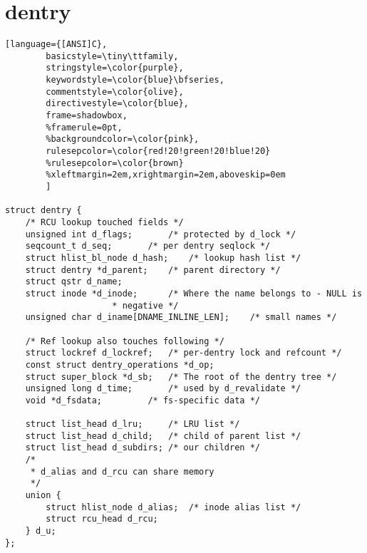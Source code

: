 \section{dentry}

\begin{lstlisting}[language={[ANSI]C},
        basicstyle=\tiny\ttfamily,
        stringstyle=\color{purple},
        keywordstyle=\color{blue}\bfseries,
        commentstyle=\color{olive},
        directivestyle=\color{blue},
        frame=shadowbox,
        %framerule=0pt,
        %backgroundcolor=\color{pink},
        rulesepcolor=\color{red!20!green!20!blue!20}
        %rulesepcolor=\color{brown}
        %xleftmargin=2em,xrightmargin=2em,aboveskip=0em
        ]

struct dentry {
	/* RCU lookup touched fields */
	unsigned int d_flags;		/* protected by d_lock */
	seqcount_t d_seq;		/* per dentry seqlock */
	struct hlist_bl_node d_hash;	/* lookup hash list */
	struct dentry *d_parent;	/* parent directory */
	struct qstr d_name;
	struct inode *d_inode;		/* Where the name belongs to - NULL is
					 * negative */
	unsigned char d_iname[DNAME_INLINE_LEN];	/* small names */

	/* Ref lookup also touches following */
	struct lockref d_lockref;	/* per-dentry lock and refcount */
	const struct dentry_operations *d_op;
	struct super_block *d_sb;	/* The root of the dentry tree */
	unsigned long d_time;		/* used by d_revalidate */
	void *d_fsdata;			/* fs-specific data */

	struct list_head d_lru;		/* LRU list */
	struct list_head d_child;	/* child of parent list */
	struct list_head d_subdirs;	/* our children */
	/*
	 * d_alias and d_rcu can share memory
	 */
	union {
		struct hlist_node d_alias;	/* inode alias list */
	 	struct rcu_head d_rcu;
	} d_u;
};


\end{lstlisting}
